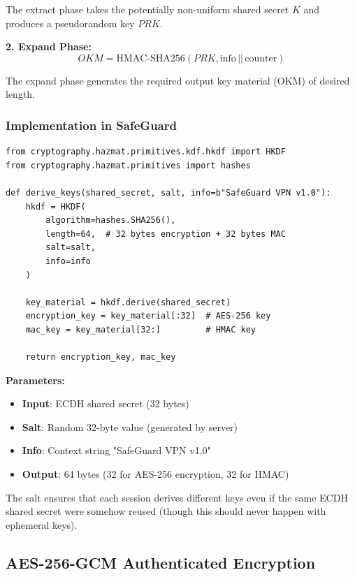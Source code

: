 \documentclass[12pt,a4paper]{article}
\begin{document}
The extract phase takes the potentially non-uniform shared secret $K$ and produces a pseudorandom key $PRK$.

\textbf{2. Expand Phase:}
\begin{equation}
OKM = \text{HMAC-SHA256}(PRK, \text{info} \,||\, \text{counter})
\end{equation}

The expand phase generates the required output key material (OKM) of desired length.

\subsubsection{Implementation in SafeGuard}

\begin{lstlisting}[style=pythonstyle, caption={HKDF key derivation}]
from cryptography.hazmat.primitives.kdf.hkdf import HKDF
from cryptography.hazmat.primitives import hashes

def derive_keys(shared_secret, salt, info=b"SafeGuard VPN v1.0"):
    hkdf = HKDF(
        algorithm=hashes.SHA256(),
        length=64,  # 32 bytes encryption + 32 bytes MAC
        salt=salt,
        info=info
    )
    
    key_material = hkdf.derive(shared_secret)
    encryption_key = key_material[:32]  # AES-256 key
    mac_key = key_material[32:]         # HMAC key
    
    return encryption_key, mac_key
\end{lstlisting}

\textbf{Parameters:}
\begin{itemize}
    \item \textbf{Input}: ECDH shared secret (32 bytes)
    \item \textbf{Salt}: Random 32-byte value (generated by server)
    \item \textbf{Info}: Context string "SafeGuard VPN v1.0"
    \item \textbf{Output}: 64 bytes (32 for AES-256 encryption, 32 for HMAC)
\end{itemize}

The salt ensures that each session derives different keys even if the same ECDH shared secret were somehow reused (though this should never happen with ephemeral keys).

\subsection{AES-256-GCM Authenticated Encryption}
\end{document}
